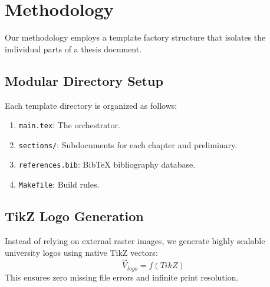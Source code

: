 \chapter{Methodology}
\label{ch:methodology}
Our methodology employs a template factory structure that isolates the individual parts of a thesis document.

\section{Modular Directory Setup}
Each template directory is organized as follows:
\begin{enumerate}
    \item \texttt{main.tex}: The orchestrator.
    \item \texttt{sections/}: Subdocuments for each chapter and preliminary.
    \item \texttt{references.bib}: BibTeX bibliography database.
    \item \texttt{Makefile}: Build rules.
\end{enumerate}

\section{TikZ Logo Generation}
Instead of relying on external raster images, we generate highly scalable university logos using native TikZ vectors:
\begin{equation}
    \vec{V}_{logo} = f(TikZ)
\end{equation}
This ensures zero missing file errors and infinite print resolution.
